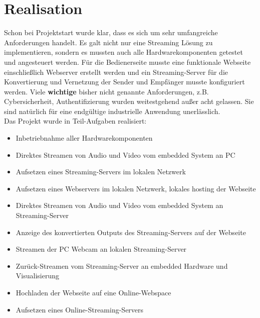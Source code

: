 \section{Realisation} \label{RefIntro}
Schon bei Projektstart wurde klar, dass es sich um sehr umfangreiche Anforderungen handelt. Es galt nicht nur eine Streaming Lösung zu implementieren, sondern es mussten auch alle Hardwarekomponenten getestet und angesteuert werden. Für die Bedienerseite musste eine funktionale Webseite einschließlich Webserver erstellt werden und ein Streaming-Server für die Konvertierung und Vernetzung der Sender und Empfänger musste konfiguriert werden. Viele \textbf{wichtige} bisher nicht genannte Anforderungen, z.B. Cybersicherheit, Authentifizierung wurden weitestgehend außer acht gelassen. Sie sind natürlich für eine endgültige industrielle Anwendung unerlässlich.\\

Das Projekt wurde in Teil-Aufgaben realisiert:
\begin{itemize}
\item Inbetriebnahme aller Hardwarekomponenten

\item Direktes Streamen von Audio und Video vom embedded System an PC
\item Aufsetzen eines Streaming-Servers im lokalen Netzwerk
\item Aufsetzen eines Webservers im lokalen Netzwerk, lokales hosting der Webseite
\item Direktes Streamen von Audio und Video vom embedded System an Streaming-Server
\item Anzeige des konvertierten Outputs des Streaming-Servers auf der Webseite
\item Streamen der PC Webcam an lokalen Streaming-Server
\item Zurück-Streamen vom Streaming-Server an embedded Hardware und Visualisierung
\item Hochladen der Webseite auf eine Online-Webspace
\item Aufsetzen eines Online-Streaming-Servers
\end{itemize}

